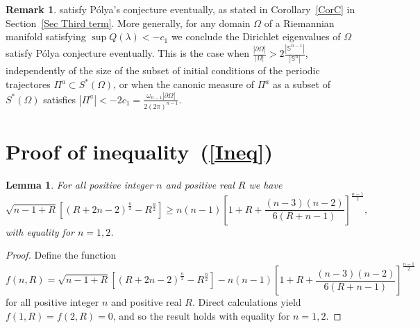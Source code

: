 \documentclass[11pt,a4paper,times]{amsart}
\theoremstyle{plain}
\newtheorem{lemma}[thm]{Lemma}
\theoremstyle{definition}
\newtheorem{remark}{Remark}[section]
\numberwithin{equation}{section}
\begin{document}
{\begin{remark}
satisfy P\'{o}lya's conjecture eventually, as stated in Corollary~\ref{CorC} in Section~\ref{Sec Third term}.
More generally, for any domain $\Omega$ of a Riemannian manifold satisfying  $\sup Q(\lambda)<-c_1$ we conclude the Dirichlet eigenvalues of $\Omega$  satisfy P\'{o}lya conjecture eventually.
This is the case when 
$\frac{|\partial \Omega|}{|\Omega|}> 2 \frac{|\mathbb{S}^{n-1}|}{|\mathbb{S}^{n}|}$,
independently of the size of the  subset of initial conditions of the periodic trajectores  $\Pi^a\subset S^*(\Omega)$,  or when the canonic measure of $\Pi^a$ as a subset of $S^*(\Omega)$ satisfies 
 $|\Pi^a|< -2c_1=\frac{\omega_{n-1}|\partial \Omega|}{2(2\pi)^{n-1}}$. 
\end{remark}
 
\section{Proof of inequality~(\ref{Ineq})\label{prooflemma64}}

\begin{lemma}\label{lmx1}
For all positive integer $n$ and positive real $R$ we have
\[
\sqrt{n-1+R}\left[ (R+2n-2)^{\frac{n}{2}}-R^{\frac{n}{2}}\right]
\geq n(n-1)\left[1+R+\frac{(n-3)(n-2)}{6(R+n-1)} \right]^{\frac{n-1}{2}},
\]
with equality for $n=1,2$.
\end{lemma}

\begin{proof}
 Define the function
 \[
  f(n,R) = \sqrt{n-1+R}\left[ (R+2n-2)^{\frac{n}{2}}-R^{\frac{n}{2}}\right] - n(n-1)\left[1+R+\frac{(n-3)(n-2)}{6(R+n-1)} \right]^{\frac{n-1}{2}}
 \]
 for all positive integer $n$ and positive real $R$. Direct calculations yield $f(1,R) = f(2,R) = 0$, and so the result holds
 with equality for $n=1,2$.


\end{proof}}
\end{document}
